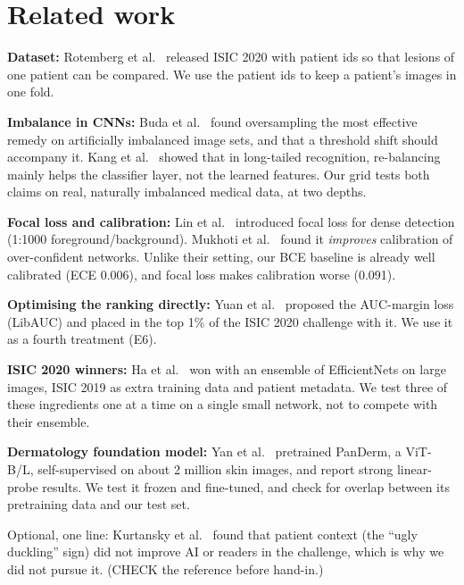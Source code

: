 \section{Related work}
\label{sec:related}
\begin{notes}
  \item \textbf{Dataset:} Rotemberg et al.~\cite{rotemberg2021patient} released ISIC 2020 with patient ids so that lesions of one patient can be compared. We use the patient ids to keep a patient's images in one fold.
  \item \textbf{Imbalance in CNNs:} Buda et al.~\cite{buda2018systematic} found oversampling the most effective remedy on artificially imbalanced image sets, and that a threshold shift should accompany it. Kang et al.~\cite{kang2020decoupling} showed that in long-tailed recognition, re-balancing mainly helps the classifier layer, not the learned features. Our grid tests both claims on real, naturally imbalanced medical data, at two depths.
  \item \textbf{Focal loss and calibration:} Lin et al.~\cite{lin2017focal} introduced focal loss for dense detection (1:1000 foreground/background). Mukhoti et al.~\cite{mukhoti2020calibrating} found it \emph{improves} calibration of over-confident networks. Unlike their setting, our BCE baseline is already well calibrated (ECE 0.006), and focal loss makes calibration worse (0.091).
  \item \textbf{Optimising the ranking directly:} Yuan et al.~\cite{yuan2021large} proposed the AUC-margin loss (LibAUC) and placed in the top 1\% of the ISIC 2020 challenge with it. We use it as a fourth treatment (E6).
  \item \textbf{ISIC 2020 winners:} Ha et al.~\cite{ha2020identifying} won with an ensemble of EfficientNets on large images, ISIC 2019 as extra training data and patient metadata. We test three of these ingredients one at a time on a single small network, not to compete with their ensemble.
  \item \textbf{Dermatology foundation model:} Yan et al.~\cite{yan2025panderm} pretrained PanDerm, a ViT-B/L, self-supervised on about 2 million skin images, and report strong linear-probe results. We test it frozen and fine-tuned, and check for overlap between its pretraining data and our test set.
  \item Optional, one line: Kurtansky et al.~\cite{kurtansky2024patient} found that patient context (the ``ugly duckling'' sign) did not improve AI or readers in the challenge, which is why we did not pursue it. (CHECK the reference before hand-in.)
\end{notes}

